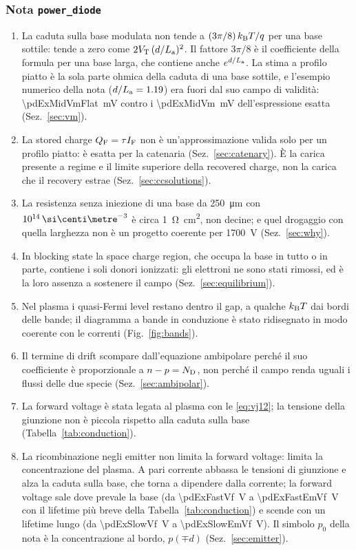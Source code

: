 \documentclass[10pt,a4paper]{scrartcl}
\let\newcommand\pdvaluedefine
\newcommand{\IF}{I_\mathrm{F}}
\newcommand{\VT}{V_\mathrm{T}}
\newcommand{\ND}{N_\mathrm{D}}
\newcommand{\La}{L_\mathrm{a}}
\newcommand{\QF}{Q_\mathrm{F}}
\newcommand{\kB}{k_\mathrm{B}}
\newcommand{\Nm}{n\textsuperscript{--}}
\newcommand{\Np}{n\textsuperscript{+}}
\newcommand{\cmc}{\si{\centi\metre^{-3}}}
\begin{document}
\subsubsection*{Nota \texttt{power\_diode}}
\begin{enumerate}
\item La caduta sulla base modulata non tende a $(3\pi/8)\,\kB T/q$ per una base sottile: tende a zero come $2\VT\,(d/\La)^2$. Il fattore $3\pi/8$ è il coefficiente della formula per una base larga, che contiene anche $e^{d/\La}$. La stima a profilo piatto è la sola parte ohmica della caduta di una base sottile, e l'esempio numerico della nota ($d/\La = \pdExMidBeta$) era fuori dal suo campo di validità: \SI{\pdExMidVmFlat}{\milli\volt} contro i \SI{\pdExMidVm}{\milli\volt} dell'espressione esatta (Sez.~\ref{sec:vm}).
\item La stored charge $\QF = \tau\IF$ non è un'approssimazione valida solo per un profilo piatto: è esatta per la catenaria (Sez.~\ref{sec:catenary}). È la carica presente a regime e il limite superiore della recovered charge, non la carica che il recovery estrae (Sez.~\ref{sec:ccsolutions}).
\item La resistenza senza iniezione di una base da \SI{250}{\micro\metre} con $10^{14}\,\cmc$ è circa \SI{1}{\ohm\centi\metre\squared}, non decine; e quel drogaggio con quella larghezza non è un progetto coerente per \SI{1700}{\volt} (Sez.~\ref{sec:why}).
\item In blocking state la space charge region, che occupa la base in tutto o in parte, contiene i soli donori ionizzati: gli elettroni ne sono stati rimossi, ed è la loro assenza a sostenere il campo (Sez.~\ref{sec:equilibrium}).
\item Nel plasma i quasi-Fermi level restano dentro il gap, a qualche $\kB T$ dai bordi delle bande; il diagramma a bande in conduzione è stato ridisegnato in modo coerente con le correnti (Fig.~\ref{fig:bands}).
\item Il termine di drift scompare dall'equazione ambipolare perché il suo coefficiente è proporzionale a $n - p = \ND$, non perché il campo renda uguali i flussi delle due specie (Sez.~\ref{sec:ambipolar}).
\item La forward voltage è stata legata al plasma con le \eqref{eq:vj12}; la tensione della giunzione \Nm\Np{} non è piccola rispetto alla caduta sulla base (Tabella~\ref{tab:conduction}).
\item La ricombinazione negli emitter non limita la forward voltage: limita la concentrazione del plasma. A pari corrente abbassa le tensioni di giunzione e alza la caduta sulla base, che torna a dipendere dalla corrente; la forward voltage sale dove prevale la base (da \SI{\pdExFastVf}{\volt} a \SI{\pdExFastEmVf}{\volt} con il lifetime più breve della Tabella~\ref{tab:conduction}) e scende con un lifetime lungo (da \SI{\pdExSlowVf}{\volt} a \SI{\pdExSlowEmVf}{\volt}). Il simbolo $p_0$ della nota è la concentrazione al bordo, $p(\mp d)$ (Sez.~\ref{sec:emitter}).

\end{enumerate}
\end{document}
